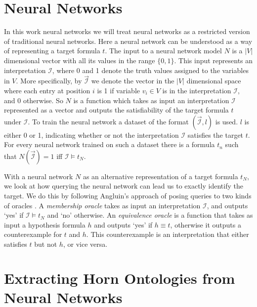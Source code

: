 
\section{Neural Networks}
In this work neural networks we will treat neural networks as a restricted version of traditional neural networks. Here a neural network can be understood as a way of representing a target formula $t$. The input to a neural network model $N$ is a $|V|$ dimensional vector with all its values in the range $\{0, 1\}$. This input represents an interpretation $\mathcal{I}$, where 0 and 1 denote the truth values assigned to the variables in $V$. More specifically, by $\overrightarrow{\mathcal{I}}$ we denote the vector in the $|V|$ dimensional space where each entry at position $i$ is 1 if variable $v_i \in V$ is in the interpretation $\mathcal{I}$, and 0 otherwise. So $N$ is a function which takes as input an interpretation $\mathcal{I}$ represented as a vector and outputs the satisfiability of the target formula $t$ under $\mathcal{I}$.
To train the neural network a dataset of the format $(\overrightarrow{\mathcal{I}}, l)$ is used. $l$ is either 0 or 1, indicating whether or not the interpretation $\mathcal{I}$ satisfies the target $t$. For every neural network trained on such a dataset there is a formula $t_n$ such that $N(\overrightarrow{\mathcal{I}}) = 1$ iff $\mathcal{I} \models t_N$.

With a neural network $N$ as an alternative representation of a target formula $t_N$, we look at how querying the neural network can lead us to exactly identify the target. We do this by following Angluin's approach of posing queries to two kinds of oracles \cite{DBLP:journals/ml/AngluinFP92}. A \emph{membership oracle} takes as input an interpretation $\mathcal{I}$, and outputs `yes' if $\mathcal{I} \models t_N$ and `no' otherwise. An \emph{equivalence oracle} is a function that takes as input a hypothesis formula $h$ and outputs `yes' if $h \equiv t$, otherwise it outputs a counterexample for $t$ and $h$. This counterexample is an interpretation that either satisfies $t$ but not $h$, or vice versa.


\section{Extracting Horn Ontologies from Neural Networks}

